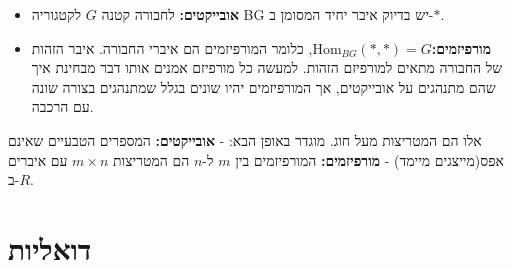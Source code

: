 \documentclass{tstextbook}
\begin{document}
\begin{definition}[הקטגוריה BG]
  \begin{itemize}
    \item \textbf{אובייקטים:} לחבורה קטנה \(G\) לקטגוריה BG יש בדיוק איבר יחיד המסומן ב-\(*\).
    \item \textbf{מורפיזמים:}\({\mathrm{Hom}}_{B G}(*,*)=G\), כלומר המורפיזמים הם איברי החבורה. איבר הזהות של החבורה מתאים למורפיזם הזהות.
למעשה כל מורפיזם אמנים אותו דבר מבחינת איך שהם מתנהגים על אובייקטים, אך המורפיזמים יהיו שונים בגלל שמתנהגים בצורה שונה עם הרכבה.
  \end{itemize}
\end{definition}
\begin{definition}
אלו הם המטריצות מעל חוג. מוגדר באופן הבא:
- \textbf{אובייקטים:} המספרים הטבעיים שאינם אפס(מייצגים מיימד)
- \textbf{מורפיזמים:} המורפיזמים בין \(m\) ל-\(n\) הם המטריצות \(m\times n\) עם איברים ב-\(R\).

\end{definition}
\section{דואליות}
\end{document}
